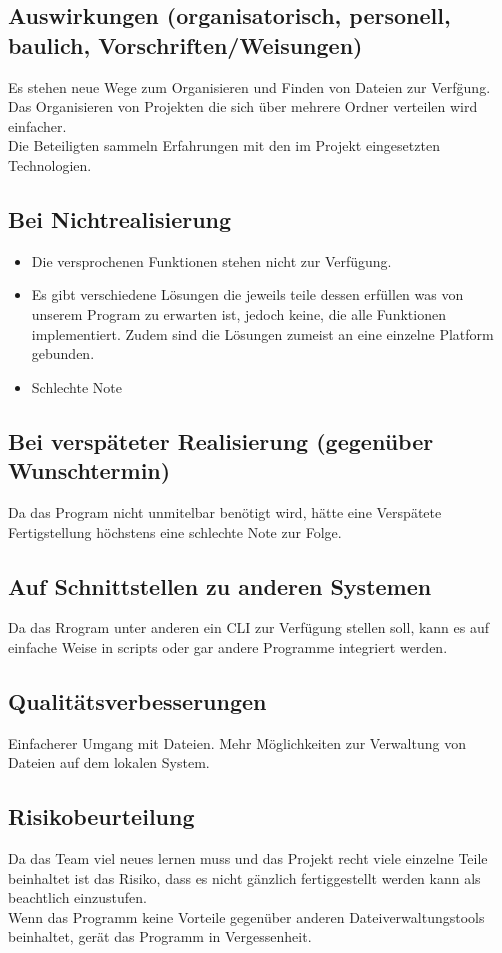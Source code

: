 \documentclass[10pt,paper=a4,final]{scrartcl}
\begin{document}
\subsection{Auswirkungen (organisatorisch, personell, baulich, Vorschriften/Weisungen)}
Es stehen neue Wege zum Organisieren und Finden von Dateien zur Verf\"gung.\\
Das Organisieren von Projekten die sich \"uber mehrere Ordner verteilen wird einfacher.\\
Die Beteiligten sammeln Erfahrungen mit den im Projekt eingesetzten Technologien.
\subsection{Bei Nichtrealisierung}
\begin{itemize}
  \item Die versprochenen Funktionen stehen nicht zur Verf\"ugung.\\
  \item Es gibt verschiedene L\"osungen die jeweils teile dessen erf\"ullen was von unserem Program zu erwarten ist, jedoch keine, die alle Funktionen implementiert. Zudem sind die L\"osungen zumeist an eine einzelne Platform gebunden.
  \item Schlechte Note
\end{itemize}
\subsection{Bei versp\"ateter Realisierung (gegen\"uber Wunschtermin)}
Da das Program nicht unmitelbar ben\"otigt wird, h\"atte eine Versp\"atete Fertigstellung h\"ochstens eine schlechte Note zur Folge.
\subsection{Auf Schnittstellen zu anderen Systemen}
Da das Rrogram unter anderen ein CLI zur Verf\"ugung stellen soll, kann es auf einfache Weise in scripts oder gar andere Programme integriert werden.
\subsection{Qualitätsverbesserungen}
Einfacherer Umgang mit Dateien. Mehr M\"oglichkeiten zur Verwaltung von Dateien auf dem lokalen System.
\subsection{Risikobeurteilung}
Da das Team viel neues lernen muss und das Projekt recht viele einzelne Teile beinhaltet ist das Risiko, dass es nicht g\"anzlich fertiggestellt werden kann als beachtlich einzustufen.\\
Wenn das Programm keine Vorteile gegenüber anderen Dateiverwaltungstools beinhaltet, gerät das Programm in Vergessenheit.
\end{document}
